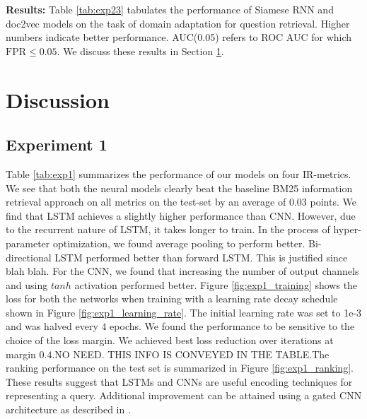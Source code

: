 \documentclass{sigkddExp}
\begin{document}
\textbf{Results:} Table \ref{tab:exp23} tabulates the performance of Siamese RNN and \textsf{doc2vec} models on the task of domain adaptation for question retrieval. Higher numbers indicate better performance. AUC(0.05) refers to ROC AUC for which $\mathrm{FPR} \leq 0.05$. We discuss these results in Section \ref{discussion}.

\section{Discussion}
\label{discussion}
\subsection{Experiment 1}
Table \ref{tab:exp1} summarizes the performance of our models on four IR-metrics. We see that both the neural models clearly beat the baseline \textsf{BM25} information retrieval approach on all metrics on the test-set by an average of 0.03 points. We find that LSTM achieves a slightly higher performance than CNN. However, due to the recurrent nature of LSTM, it takes longer to train. In the process of hyper-parameter optimization, we found average pooling to perform better. Bi-directional LSTM performed better than forward LSTM. This is justified since {\color{red}blah blah}. For the CNN, we found that increasing the number of output channels and using $tanh$ activation performed better. Figure \ref{fig:exp1_training} shows the loss for both the networks when training with a learning rate decay schedule shown in Figure \ref{fig:exp1_learning_rate}. The initial learning rate was set to 1e-3 and was halved every $4$ epochs. We found the performance to be sensitive to the choice of the loss margin. We achieved best loss reduction over iterations at margin $0.4$.{\color{red}NO NEED. THIS INFO IS CONVEYED IN THE TABLE.The ranking performance on the test set is summarized in Figure \ref{fig:exp1_ranking}.} These results suggest that LSTMs and CNNs are useful encoding techniques for representing a query. Additional improvement can be attained using a gated CNN architecture as described in \cite{lei2015semi}.
\end{document}
